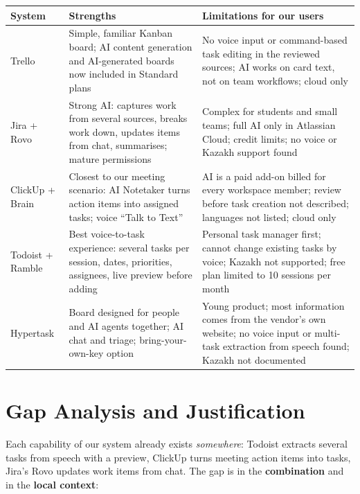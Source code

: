\documentclass[11pt,a4paper]{article}
\newcommand{\tblstart}{\small\rowcolors{2}{gray!7}{white}}
\begin{document}
{\tblstart
\begin{xltabular}{\textwidth}{P{2.4cm} L L}
\toprule
\textbf{System} & \textbf{Strengths} & \textbf{Limitations for our users} \\
\midrule
\endhead
Trello & Simple, familiar Kanban board; AI content generation and AI-generated boards now included in Standard plans & No voice input or command-based task editing in the reviewed sources; AI works on card text, not on team workflows; cloud only \\
Jira + Rovo & Strong AI: captures work from several sources, breaks work down, updates items from chat, summarises; mature permissions & Complex for students and small teams; full AI only in Atlassian Cloud; credit limits; no voice or Kazakh support found \\
ClickUp + Brain & Closest to our meeting scenario: AI Notetaker turns action items into assigned tasks; voice ``Talk to Text'' & AI is a paid add-on billed for every workspace member; review before task creation not described; languages not listed; cloud only \\
Todoist + Ramble & Best voice-to-task experience: several tasks per session, dates, priorities, assignees, live preview before adding & Personal task manager first; cannot change existing tasks by voice; Kazakh not supported; free plan limited to 10 sessions per month \\
Hypertask & Board designed for people and AI agents together; AI chat and triage; bring-your-own-key option & Young product; most information comes from the vendor's own website; no voice input or multi-task extraction from speech found; Kazakh not documented \\
\bottomrule
\end{xltabular}}

\section{Gap Analysis and Justification}

Each capability of our system already exists \emph{somewhere}: Todoist extracts several tasks from speech with a preview, ClickUp turns meeting action items into tasks, Jira's Rovo updates work items from chat. The gap is in the \textbf{combination} and in the \textbf{local context}:
\end{document}
